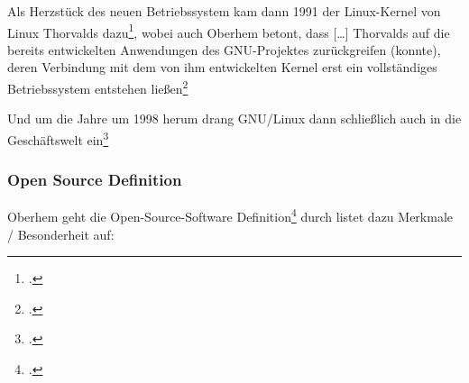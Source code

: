 \documentclass[DIV=calc,BCOR=5mm,11pt,headings=small,oneside,abstract=true, toc=bib]{scrartcl}
\begin{document}
Als \glqq{}Herzstück\grqq{} des neuen Betriebssystem kam dann 1991 der
Linux-Kernel von Linux Thorvalds dazu\footcite[vgl.][23]{Oberhem2008a}, wobei
auch Oberhem betont, dass \glqq{}[\ldots] Thorvalds auf die bereits
entwickelten Anwendungen des GNU-Projektes zurückgreifen (konnte), deren
Verbindung mit dem von ihm entwickelten Kernel erst ein vollständiges
Betriebssystem entstehen ließen\grqq{}\footcite[vgl.][24]{Oberhem2008a}

Und um die Jahre um 1998 herum drang GNU/Linux dann schließlich auch in die
Geschäftswelt ein\footcite[vgl.][25]{Oberhem2008a}

\subsubsection{Open Source Definition}

Oberhem geht die \glqq{}Open-Source-Software
Definition\grqq{}\footcite[vgl.][10. Die Abwandlung des
originären Namens dürfte ihrer Einteilungvon Open Source als
Oberbegriff geschuldet sein]{Oberhem2008a} durch listet dazu Merkmale /
Besonderheit auf:
\end{document}
